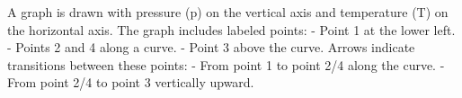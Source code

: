 A graph is drawn with pressure (p) on the vertical axis and temperature (T) on the horizontal axis. The graph includes labeled points:  
- Point 1 at the lower left.  
- Points 2 and 4 along a curve.  
- Point 3 above the curve.  
Arrows indicate transitions between these points:  
- From point 1 to point 2/4 along the curve.  
- From point 2/4 to point 3 vertically upward.
